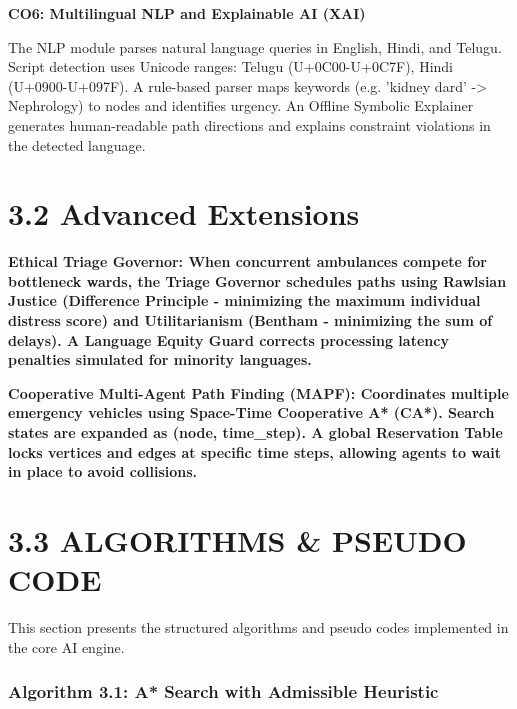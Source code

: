 \documentclass[12pt,a4paper]{report}
\begin{document}
\textbf{CO6: Multilingual NLP and Explainable AI (XAI)}

The NLP module parses natural language queries in English, Hindi, and Telugu. Script detection uses Unicode ranges: Telugu (U+0C00-U+0C7F), Hindi (U+0900-U+097F). A rule-based parser maps keywords (e.g. 'kidney dard' -> Nephrology) to nodes and identifies urgency. An Offline Symbolic Explainer generates human-readable path directions and explains constraint violations in the detected language.


\section{3.2 Advanced Extensions}

\textbf{Ethical Triage Governor: When concurrent ambulances compete for bottleneck wards, the Triage Governor schedules paths using Rawlsian Justice (Difference Principle - minimizing the maximum individual distress score) and Utilitarianism (Bentham - minimizing the sum of delays). A Language Equity Guard corrects processing latency penalties simulated for minority languages.}

\textbf{Cooperative Multi-Agent Path Finding (MAPF): Coordinates multiple emergency vehicles using Space-Time Cooperative A* (CA*). Search states are expanded as (node, time\_step). A global Reservation Table locks vertices and edges at specific time steps, allowing agents to wait in place to avoid collisions.}


\section{3.3 ALGORITHMS \& PSEUDO CODE}

This section presents the structured algorithms and pseudo codes implemented in the core AI engine.


\subsubsection*{Algorithm 3.1: A* Search with Admissible Heuristic}
\end{document}
